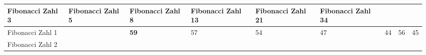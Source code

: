 \documentclass[ngerman,]{article}
\begin{document}
\begin{longtable}[]{@{}lllllllll@{}}
\begin{minipage}[b]{0.07\columnwidth}
Fibonacci Zahl 3\strut
\end{minipage} & \begin{minipage}[b]{0.07\columnwidth}\raggedright\strut
Fibonacci Zahl 5\strut
\end{minipage} & \begin{minipage}[b]{0.07\columnwidth}\raggedright\strut
Fibonacci Zahl 8\strut
\end{minipage} & \begin{minipage}[b]{0.07\columnwidth}\raggedright\strut
Fibonacci Zahl 13\strut
\end{minipage} & \begin{minipage}[b]{0.07\columnwidth}\raggedright\strut
Fibonacci Zahl 21\strut
\end{minipage} & \begin{minipage}[b]{0.07\columnwidth}\raggedright\strut
Fibonacci Zahl 34\strut
\end{minipage}\tabularnewline
\midrule
\endhead
\begin{minipage}[t]{0.19\columnwidth}\raggedright\strut
Fibonacci Zahl 1\strut
\end{minipage} & \begin{minipage}[t]{0.07\columnwidth}\raggedright\strut
\strut
\end{minipage} & \begin{minipage}[t]{0.07\columnwidth}\raggedright\strut
\textbf{59}\strut
\end{minipage} & \begin{minipage}[t]{0.07\columnwidth}\raggedright\strut
57\strut
\end{minipage} & \begin{minipage}[t]{0.07\columnwidth}\raggedright\strut
54\strut
\end{minipage} & \begin{minipage}[t]{0.07\columnwidth}\raggedright\strut
47\strut
\end{minipage} & \begin{minipage}[t]{0.07\columnwidth}\raggedright\strut
44\strut
\end{minipage} & \begin{minipage}[t]{0.07\columnwidth}\raggedright\strut
56\strut
\end{minipage} & \begin{minipage}[t]{0.07\columnwidth}\raggedright\strut
45\strut
\end{minipage}\tabularnewline
\begin{minipage}[t]{0.19\columnwidth}\raggedright\strut
Fibonacci Zahl 2\strut

\end{minipage}
\end{longtable}
\end{document}
